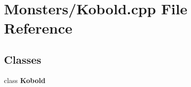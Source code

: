 \section{Monsters/\-Kobold.cpp File Reference}
\label{_kobold_8cpp}
\subsection*{Classes}
\begin{DoxyCompactItemize}
\item 
class {\bf Kobold}
\end{DoxyCompactItemize}
